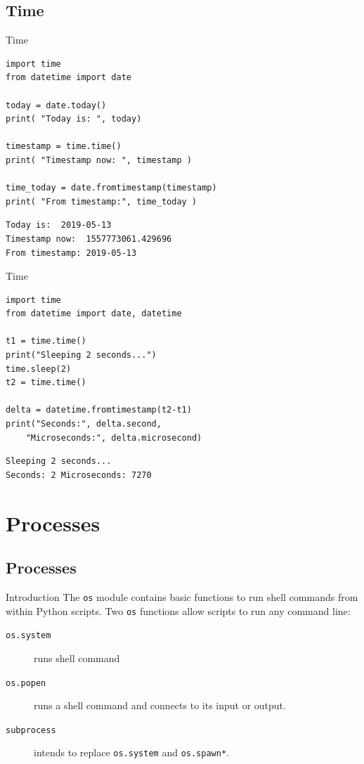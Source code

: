 \documentclass[xcolor=dvipsnames, 10pt, presentation,aspectratio=169]{beamer}
\begin{document}
\subsection{Time}
\label{sec:org4038672}
\begin{frame}[label={sec:orgb3c39ee},fragile]{Time}
 \lstset{language=Python,label= ,caption= ,captionpos=b,numbers=none}
\begin{lstlisting}
import time
from datetime import date

today = date.today()
print( "Today is: ", today)

timestamp = time.time()
print( "Timestamp now: ", timestamp )

time_today = date.fromtimestamp(timestamp)
print( "From timestamp:", time_today )
\end{lstlisting}

\begin{verbatim}
Today is:  2019-05-13
Timestamp now:  1557773061.429696
From timestamp: 2019-05-13
\end{verbatim}
\end{frame}
\begin{frame}[label={sec:orgb8f161c},fragile]{Time}
 \lstset{language=Python,label= ,caption= ,captionpos=b,numbers=none}
\begin{lstlisting}
import time
from datetime import date, datetime

t1 = time.time()
print("Sleeping 2 seconds...")
time.sleep(2)
t2 = time.time()

delta = datetime.fromtimestamp(t2-t1)
print("Seconds:", delta.second,
    "Microseconds:", delta.microsecond)
\end{lstlisting}

\begin{verbatim}
Sleeping 2 seconds...
Seconds: 2 Microseconds: 7270
\end{verbatim}
\end{frame}

\section{Processes}
\label{sec:orgc4d5347}
\subsection{Processes}
\label{sec:orgb16d6ca}
\begin{frame}[label={sec:orge8f40d8},fragile]{Introduction}
 The \texttt{os} module contains basic functions to run shell commands from
within Python scripts.  Two \texttt{os} functions allow scripts to run any
command line:
\begin{description}
\item[{\texttt{os.system}}] runs shell command
\item[{\texttt{os.popen}}] runs a shell command and connects to its input or
output.
\item[{\texttt{subprocess}}] intends to replace \texttt{os.system} and \texttt{os.spawn*}.
\end{description}
\end{frame}
\end{document}
